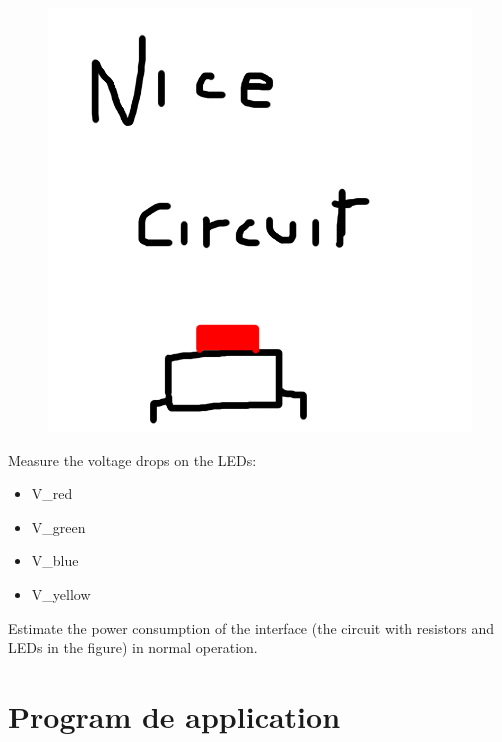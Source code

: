 \documentclass[10pt]{article}
\begin{document}
\begin{figure}[H]
    \centering
    \includegraphics{button_circuit.png}
\end{figure}

Measure the voltage drops on the LEDs:

\begin{itemize}[label={}]
    \item V\_red
    \item V\_green
    \item V\_blue
    \item V\_yellow
\end{itemize}


Estimate the power consumption of the interface (the circuit with resistors and
LEDs in the figure) in normal operation.


\newpage

\section{Program de application}

\inputminted{arduino}{../lab1.ino}
\end{document}

